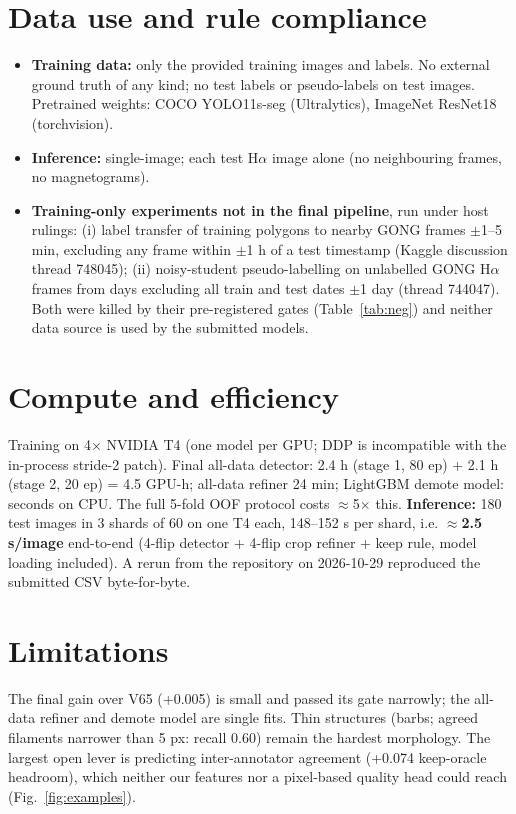 \documentclass[10pt,twocolumn]{article}
\begin{document}
\section{Data use and rule compliance}
\begin{itemize}
\item \textbf{Training data:} only the provided training images and labels. No external ground truth of any
kind; no test labels or pseudo-labels on test images. Pretrained weights: COCO YOLO11s-seg (Ultralytics),
ImageNet ResNet18 (torchvision).
\item \textbf{Inference:} single-image; each test H$\alpha$ image alone (no neighbouring frames, no
magnetograms).
\item \textbf{Training-only experiments not in the final pipeline}, run under host rulings: (i) label transfer of
training polygons to nearby GONG frames $\pm$1--5 min, excluding any frame within $\pm$1 h of a test timestamp
(Kaggle discussion thread 748045); (ii) noisy-student pseudo-labelling on unlabelled GONG H$\alpha$ frames from
days excluding all train and test dates $\pm$1 day (thread 744047). Both were killed by their pre-registered
gates (Table~\ref{tab:neg}) and neither data source is used by the submitted models.
\end{itemize}

\section{Compute and efficiency}
Training on 4$\times$ NVIDIA T4 (one model per GPU; DDP is incompatible with the in-process stride-2 patch).
Final all-data detector: 2.4 h (stage 1, 80 ep) + 2.1 h (stage 2, 20 ep) = 4.5 GPU-h; all-data refiner 24 min;
LightGBM demote model: seconds on CPU. The full 5-fold OOF protocol costs $\approx$5$\times$ this.
\textbf{Inference:} 180 test images in 3 shards of 60 on one T4 each, 148--152 s per shard, i.e.
$\approx$\textbf{2.5 s/image} end-to-end (4-flip detector + 4-flip crop refiner + keep rule, model loading
included). A rerun from the repository on 2026-10-29 reproduced the submitted CSV byte-for-byte.

\section{Limitations}
The final gain over V65 (+0.005) is small and passed its gate narrowly; the all-data refiner and demote model
are single fits. Thin structures (barbs; agreed filaments narrower than 5 px: recall 0.60) remain the hardest morphology. The
largest open lever is predicting inter-annotator agreement (+0.074 keep-oracle headroom), which neither our
features nor a pixel-based quality head could reach (Fig.~\ref{fig:examples}).
\end{document}

